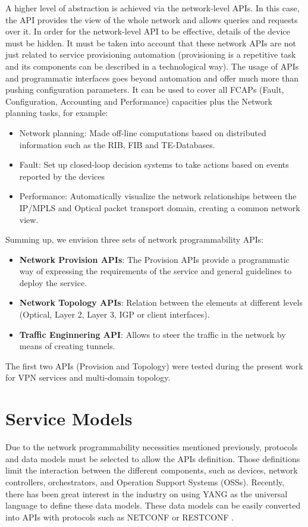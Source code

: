 \documentclass[a4paper,fleqn]{cas-dc}
\begin{document}
A higher level of abstraction is achieved via the network-level APIs. In this case, the API provides the view of the whole network and allows queries and requests over it. In order for the network-level API to be effective, details of the device must be hidden. It must be taken into account that these network APIs are not just related to service provisioning automation (provisioning is a repetitive task and its components can be described in a technological way). The usage of APIs and programmatic interfaces goes beyond automation and offer much more than pushing configuration parameters.  It can be used to cover all FCAPs (Fault, Configuration, Accounting and Performance) capacities plus the Network planning tasks, for example:
\begin{itemize}
    \item Network planning: Made off-line computations based on distributed information such as the RIB, FIB and TE-Databases.
    \item Fault: Set up closed-loop decision systems to take actions based on events reported by the devices
    \item Performance: Automatically visualize the network relationships between the IP/MPLS and Optical packet transport domain, creating a common network view.
\end{itemize}

Summing up, we envision three sets of network programmability APIs:
\begin{itemize}
\item \textbf{Network Provision APIs}: The Provision APIs provide a programmatic way of expressing the requirements of the service and general guidelines to deploy the service.
\item \textbf{Network Topology APIs}: Relation between the elements at different levels (Optical, Layer 2, Layer 3, IGP or client interfaces). 
\item \textbf{Traffic Enginnering API}: Allows to steer the traffic in the network by means of creating tunnels. 
 \end{itemize}
 
The first two APIs (Provision and Topology) were tested during the present work for VPN services and multi-domain topology.
 
\section{Service Models}
\label{section:models}
Due to the network programmability necessities mentioned previously, protocols and data models must be selected to allow the APIs definition. Those definitions limit the interaction between the different components, such as devices, network controllers, orchestrators, and Operation Support Systems (OSSs). Recently, there has been great interest in the industry on using YANG as the universal language to define these data models. These data models can be easily converted into APIs with protocols such as NETCONF or RESTCONF \cite{pugaczewski2017software}. 
\end{document}
